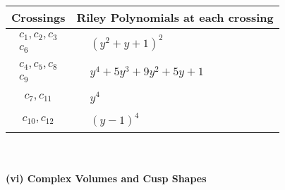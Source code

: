 \documentclass[1p]{elsarticle_modified}
\theoremstyle{definition}
\begin{document}
\begin{tabular}{m{50pt}|m{274pt}}
Crossings & \hspace{64pt}Riley Polynomials at each crossing \\
\hline $$\begin{aligned}c_{1},c_{2},c_{3}\\c_{6}\end{aligned}$$&$\begin{aligned}
&(y^2+y+1)^2
\end{aligned}$\\
\hline $$\begin{aligned}c_{4},c_{5},c_{8}\\c_{9}\end{aligned}$$&$\begin{aligned}
&y^4+5 y^3+9 y^2+5 y+1
\end{aligned}$\\
\hline $$\begin{aligned}c_{7},c_{11}\end{aligned}$$&$\begin{aligned}
&y^4
\end{aligned}$\\
\hline $$\begin{aligned}c_{10},c_{12}\end{aligned}$$&$\begin{aligned}
&(y-1)^4
\end{aligned}$\\
\hline
\end{tabular}\\~\\
\newpage\flushleft \textbf{(vi) Complex Volumes and Cusp Shapes}
\end{document}
